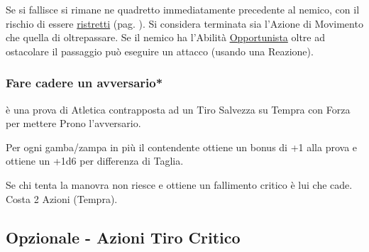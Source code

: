 \begin{multicols}{2}
Se si fallisce si rimane ne quadretto immediatamente precedente al nemico, con il rischio di essere \hyperlink{ristretti}{ristretti} (pag. \pageref{ristretti}). Si considera terminata sia l'Azione di Movimento che quella di oltrepassare.
Se il nemico ha l'Abilità \hyperlink{opportunista}{Opportunista} oltre ad ostacolare il passaggio può eseguire un attacco (usando una Reazione).

%

\subsubsection{Fare cadere un avversario*} \label{farecadereavversario}\hypertarget{farecadereavversario}{}

è una prova di Atletica contrapposta ad un Tiro Salvezza su Tempra con Forza per mettere Prono l'avversario.

Per ogni gamba/zampa in più il contendente ottiene un bonus di +1 alla prova e ottiene un +1d6 per differenza di Taglia.

Se chi tenta la manovra non riesce e ottiene un fallimento critico è lui che cade. Costa 2 Azioni (Tempra).




\subsection{Opzionale - Azioni Tiro Critico}\label{OpzionaleAzioniTiroCritico}\hypertarget{OpzionaleAzioniTiroCritico}{}


\end{multicols}
